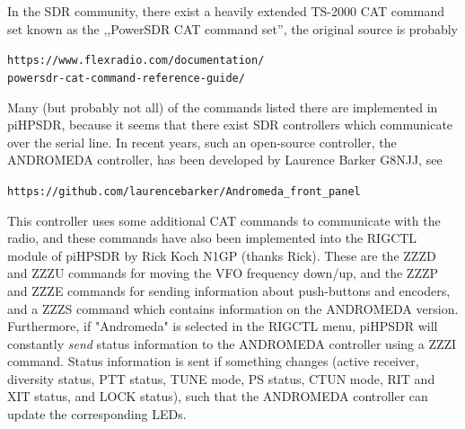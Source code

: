 \documentclass[12pt]{book}
\begin{document}
\begin{center}
\end{center}



In the SDR community, there exist a heavily extended TS-2000 CAT command set known as the ,,PowerSDR CAT
command set'', the original
source is probably

\texttt{https://www.flexradio.com/documentation/}\\
\texttt{powersdr-cat-command-reference-guide/}

Many (but probably not all) of the commands listed there are implemented in piHPSDR, because it seems that
there exist SDR controllers
which communicate over the serial line. In recent years, such an open-source controller, the ANDROMEDA
controller, has been
developed by Laurence Barker G8NJJ, see

\texttt{https://github.com/laurencebarker/Andromeda\_front\_panel}

This controller uses some additional CAT commands to communicate with the radio, and these commands have
also been implemented into
the RIGCTL module of piHPSDR by Rick Koch N1GP (thanks Rick). These are the ZZZD and ZZZU commands for
moving the VFO frequency
down/up, and the ZZZP and ZZZE commands for sending information about push-buttons and encoders, and a ZZZS
command which
contains information on the ANDROMEDA version. Furthermore, if "Andromeda" is selected in the RIGCTL menu,
piHPSDR will constantly
\textit{send} status information to the ANDROMEDA controller using a ZZZI command. Status information is
sent if something
changes (active receiver,  diversity status, PTT status, TUNE mode, PS status, CTUN mode, RIT and XIT
status, and LOCK status),
such that the ANDROMEDA controller can update the corresponding LEDs.
\end{document}
